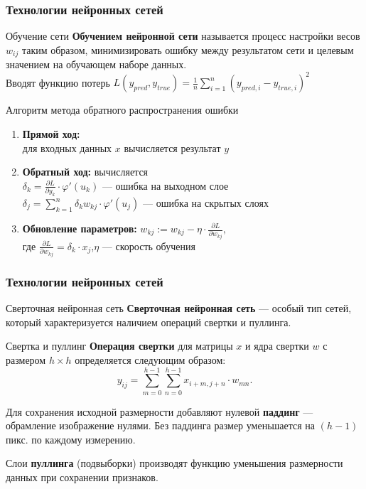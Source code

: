 \documentclass{beamer}
\renewcommand{\phi}{\varphi}
\begin{document}
\begin{frame}
	\frametitle{Технологии нейронных сетей}
	\begin{block}{Обучение сети}
		\textbf{Обучением нейронной сети} называется процесс настройки весов $w_{ij}$ таким образом, минимизировать ошибку между результатом сети и целевым значением на обучающем наборе данных. \cite[c.85]{2}\\
		Вводят функцию потерь $L(y_{pred},y_{true}) = \frac{1}{n} \sum_{i=1}^{n} (y_{pred, i} - y_{true, i})^2$
	\end{block}
	\begin{block}{Алгоритм метода обратного распространения ошибки}
		\begin{enumerate}
			\item \textbf{Прямой ход:} \\
			 для входных данных $x$ вычисляется результат $y$
			\item \textbf{Обратный ход:} вычисляется\\
			$\delta_k = \frac{\partial L}{\partial y_k} \cdot \phi'(u_k)$ --- ошибка на выходном слое \\
			$\delta_j = \sum_{k=1}^{n} \delta_k w_{kj} \cdot \phi'(u_j)$ --- ошибка на скрытых слоях
			
			\item \textbf{Обновление параметров:} 
			$w_{kj} := w_{kj} - \eta \cdot \frac{\partial L}{\partial w_{kj}},$ \\ где $\frac{\partial L}{\partial w_{kj}} = \delta_k \cdot x_j$,\quad $\eta$ --- скорость обучения 
		\end{enumerate}
	\end{block}
	
	
\end{frame}

\begin{frame}
	\frametitle{Технологии нейронных сетей}
	\begin{block}{Сверточная нейронная сеть}
		\textbf{Сверточная нейронная сеть} --- особый тип сетей, который характеризуется наличием операций свертки и пуллинга. 
	\end{block}
	\begin{block}{Свертка и пуллинг \hyperlink{pril3}{}}
	\textbf{Операция свертки} для матрицы \(x\) и ядра свертки \(w\) с размером \(h \times h\) определяется следующим образом:
	\vspace{-0.5em}
	\[ y_{ij} = \sum_{m=0}^{h-1} \sum_{n=0}^{h-1} x_{i+m, j+n} \cdot w_{mn}. \]
	\vspace{-1em}
	
	Для сохранения исходной размерности добавляют нулевой \textbf{паддинг} --- обрамление изображение нулями.  Без паддинга размер уменьшается на $(h - 1)$ пикс. по каждому измерению. 
	
	Слои \textbf{пуллинга} (подвыборки) производят функцию уменьшения размерности данных при сохранении признаков.
	\end{block}
\end{frame}
\end{document}
